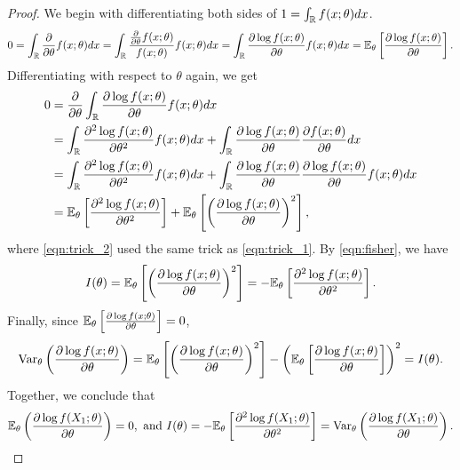 \begin{proof}
We begin with differentiating both sides of $1 = \int_{\mathbb{R}} f(x;\theta) dx$.
\begin{align}
0 = \int_{\mathbb{R}} \frac{\partial}{\partial\theta} f(x;\theta)dx
= \int_{\mathbb{R}} \frac{\frac{\partial}{\partial\theta} f(x;\theta)}{f(x;\theta)}f(x;\theta) dx
= \int_{\mathbb{R}} \frac{\partial \log f(x;\theta)}{\partial\theta}f(x;\theta) dx 
= \mathbb{E}_\theta\left[ \frac{\partial \log f(x;\theta)}{\partial\theta} \right]. \label{eqn:trick_1}
\end{align}
Differentiating with respect to $\theta$ again, we get
\begin{align}
0 &= \frac{\partial}{\partial\theta}\int_{\mathbb{R}} \frac{\partial \log f(x;\theta)}{\partial\theta}f(x;\theta) dx\nonumber\\
&= \int_{\mathbb{R}} \frac{\partial^2 \log f(x;\theta)}{\partial\theta^2}f(x;\theta) dx + \int_{\mathbb{R}} \frac{\partial \log f(x;\theta)}{\partial\theta}\frac{\partial f(x;\theta)}{\partial\theta} dx\nonumber\\
&= \int_{\mathbb{R}} \frac{\partial^2 \log f(x;\theta)}{\partial\theta^2}f(x;\theta) dx + \int_{\mathbb{R}} \frac{\partial \log f(x;\theta)}{\partial\theta}\frac{\partial \log f(x;\theta)}{\partial\theta}f(x;\theta) dx \label{eqn:trick_2} \\
&= \mathbb{E}_\theta\left[ \frac{\partial^2 \log f(x;\theta)}{\partial\theta^2} \right] + \mathbb{E}_\theta\left[ \left(\frac{\partial \log f(x;\theta)}{\partial\theta}\right)^2 \right],\nonumber
\end{align}
where \cref{eqn:trick_2} used the same trick as \cref{eqn:trick_1}. By \cref{eqn:fisher}, we have
\begin{align*}
I(\theta) = \mathbb{E}_\theta\left[ \left(\frac{\partial \log f(x;\theta)}{\partial\theta}\right)^2 \right] = -\mathbb{E}_\theta\left[ \frac{\partial^2 \log f(x;\theta)}{\partial\theta^2} \right].
\end{align*}
Finally, since $\mathbb{E}_\theta\left[ \frac{\partial \log f(x;\theta)}{\partial\theta} \right] = 0$,
\begin{align*}
\text{Var}_\theta\left( \frac{\partial \log f(x;\theta)}{\partial\theta} \right) = \mathbb{E}_\theta\left[ \left(\frac{\partial \log f(x;\theta)}{\partial\theta}\right)^2 \right] - \left( \mathbb{E}_\theta\left[ \frac{\partial \log f(x;\theta)}{\partial\theta} \right] \right)^2 = I(\theta).
\end{align*}
Together, we conclude that
\begin{align*}
\mathbb{E}_\theta\left( \frac{\partial\log f(X_1;\theta)}{\partial \theta} \right) = 0, \text{ and }
I(\theta) = -\mathbb{E}_\theta\left[ \frac{\partial^2\log f(X_1;\theta)}{\partial \theta^2} \right] = \text{Var}_\theta\left( \frac{\partial\log f(X_1;\theta)}{\partial \theta} \right).
\end{align*}
\end{proof}
